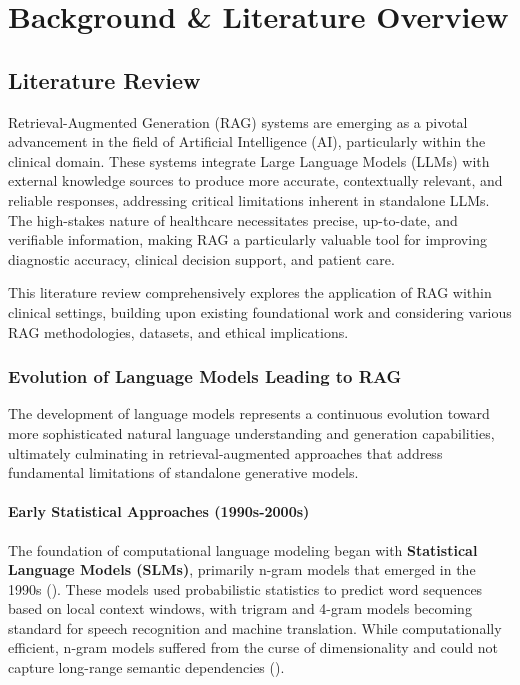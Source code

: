 \chapter{Background \& Literature Overview}
\section{Literature Review}

Retrieval-Augmented Generation (RAG) systems are emerging as a pivotal advancement in the field of Artificial Intelligence (AI), particularly within the clinical domain. These systems integrate Large Language Models (LLMs) with external knowledge sources to produce more accurate, contextually relevant, and reliable responses, addressing critical limitations inherent in standalone LLMs. The high-stakes nature of healthcare necessitates precise, up-to-date, and verifiable information, making RAG a particularly valuable tool for improving diagnostic accuracy, clinical decision support, and patient care.

This literature review comprehensively explores the application of RAG within clinical settings, building upon existing foundational work and considering various RAG methodologies, datasets, and ethical implications.

\subsection{Evolution of Language Models Leading to RAG}

The development of language models represents a continuous evolution toward more sophisticated natural language understanding and generation capabilities, ultimately culminating in retrieval-augmented approaches that address fundamental limitations of standalone generative models.

\subsubsection{Early Statistical Approaches (1990s-2000s)}
The foundation of computational language modeling began with \textbf{Statistical Language Models (SLMs)}, primarily n-gram models that emerged in the 1990s (\citep{kneser1995improved}). These models used probabilistic statistics to predict word sequences based on local context windows, with trigram and 4-gram models becoming standard for speech recognition and machine translation. While computationally efficient, n-gram models suffered from the curse of dimensionality and could not capture long-range semantic dependencies (\citep{bengio2003neural}).

